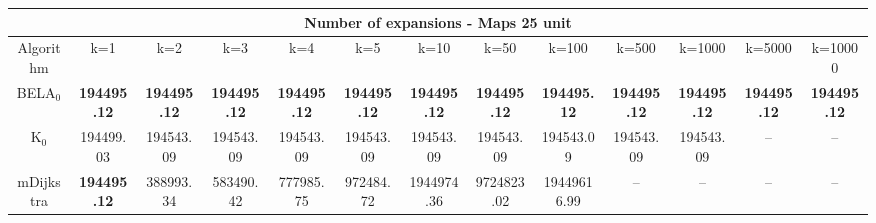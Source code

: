 \begin{tabular}{c|cccccccccccc}\toprule
\multicolumn{13}{c}{Number of expansions - Maps 25 unit}\\ \midrule
Algorithm & k=1 & k=2 & k=3 & k=4 & k=5 & k=10 & k=50 & k=100 & k=500 & k=1000 & k=5000 & k=10000 \\ \midrule
BELA$_0$ & \textbf{194495.12} & \textbf{194495.12} & \textbf{194495.12} & \textbf{194495.12} & \textbf{194495.12} & \textbf{194495.12} & \textbf{194495.12} & \textbf{194495.12} & \textbf{194495.12} & \textbf{194495.12} & \textbf{194495.12} & \textbf{194495.12} \\
K$_0$ & 194499.03 & 194543.09 & 194543.09 & 194543.09 & 194543.09 & 194543.09 & 194543.09 & 194543.09 & 194543.09 & 194543.09 & -- & -- \\
mDijkstra & \textbf{194495.12} & 388993.34 & 583490.42 & 777985.75 & 972484.72 & 1944974.36 & 9724823.02 & 19449616.99 & -- & -- & -- & -- \\ \bottomrule 
\end{tabular}
